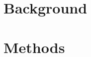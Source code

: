 \documentclass[sigconf]{acmart}
\begin{document}
\section{Background}

\section{Methods}
\end{document}
